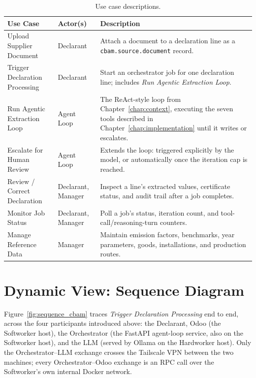 \begin{table}[H]
\centering
\begin{tabular}{|p{4.0cm}|p{2.4cm}|p{6.6cm}|}
\hline
\textbf{Use Case} & \textbf{Actor(s)} & \textbf{Description} \\
\hline
Upload Supplier Document & Declarant & Attach a document to a declaration line as a \texttt{cbam.source.document} record. \\
\hline
Trigger Declaration Processing & Declarant & Start an orchestrator job for one declaration line; includes \textit{Run Agentic Extraction Loop}. \\
\hline
Run Agentic Extraction Loop & Agent Loop & The ReAct-style loop from Chapter~\ref{chap:context}, executing the seven tools described in Chapter~\ref{chap:implementation} until it writes or escalates. \\
\hline
Escalate for Human Review & Agent Loop & Extends the loop: triggered explicitly by the model, or automatically once the iteration cap is reached. \\
\hline
Review / Correct Declaration & Declarant, Manager & Inspect a line's extracted values, certificate status, and audit trail after a job completes. \\
\hline
Monitor Job Status & Declarant, Manager & Poll a job's status, iteration count, and tool-call/reasoning-turn counters. \\
\hline
Manage Reference Data & Manager & Maintain emission factors, benchmarks, year parameters, goods, installations, and production routes. \\
\hline
\end{tabular}
\caption{Use case descriptions.}
\label{tab:usecases_cbam}
\end{table}
\FloatBarrier

\section{Dynamic View: Sequence Diagram}

Figure~\ref{fig:sequence_cbam} traces \textit{Trigger Declaration
Processing} end to end, across the four participants introduced above:
the Declarant, Odoo (the Softworker host), the Orchestrator (the FastAPI
agent-loop service, also on the Softworker host), and the LLM (served by
Ollama on the Hardworker host). Only the Orchestrator--LLM exchange
crosses the Tailscale VPN between the two machines; every
Orchestrator--Odoo exchange is an RPC call over the Softworker's own
internal Docker network.


